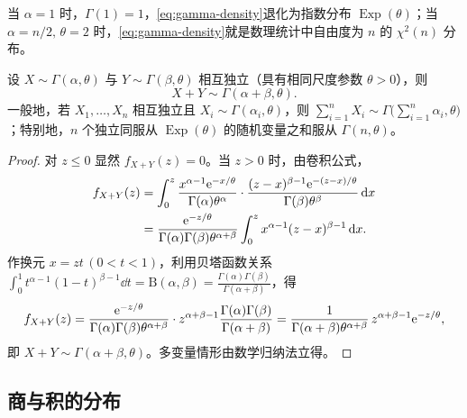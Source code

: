 当 $\alpha=1$ 时，$\Gamma(1)=1$，\eqref{eq:gamma-density}退化为指数分布 $\operatorname{Exp}(\theta)$；当 $\alpha=n/2,\,\theta=2$ 时，\eqref{eq:gamma-density}就是数理统计中自由度为 $n$ 的 $\chi^2(n)$ 分布。

\begin{proposition}
\label{prop:gamma-additivity}
设 $X\sim\Gamma(\alpha,\theta)$ 与 $Y\sim\Gamma(\beta,\theta)$ 相互独立（具有相同尺度参数 $\theta>0$），则
\[
  X+Y\sim\Gamma(\alpha+\beta,\theta).
\]
一般地，若 $X_1,\ldots,X_n$ 相互独立且 $X_i\sim\Gamma(\alpha_i,\theta)$，则 $\sum_{i=1}^{n}X_i\sim\Gamma\bigl(\sum_{i=1}^{n}\alpha_i,\theta\bigr)$；特别地，$n$ 个独立同服从 $\operatorname{Exp}(\theta)$ 的随机变量之和服从 $\Gamma(n,\theta)$。
\end{proposition}
\begin{proof}
对 $z\le 0$ 显然 $f_{X+Y}(z)=0$。当 $z>0$ 时，由卷积公式，
\[
\begin{aligned}
  f_{X+Y}(z)&=\int_{0}^{z}\frac{x^{\alpha-1}\mathrm{e}^{-x/\theta}}{\Gamma(\alpha)\theta^\alpha}\cdot
  \frac{(z-x)^{\beta-1}\mathrm{e}^{-(z-x)/\theta}}{\Gamma(\beta)\theta^\beta}\mathop{}\!\mathrm{d} x\\
  &=\frac{\mathrm{e}^{-z/\theta}}{\Gamma(\alpha)\Gamma(\beta)\theta^{\alpha+\beta}}
  \int_{0}^{z}x^{\alpha-1}(z-x)^{\beta-1}\mathop{}\!\mathrm{d} x.
\end{aligned}
\]
作换元 $x=zt\,(0<t<1)$，利用贝塔函数关系 $\int_{0}^{1}t^{\alpha-1}(1-t)^{\beta-1}\dd t=\mathrm{B}(\alpha,\beta)=\frac{\Gamma(\alpha)\Gamma(\beta)}{\Gamma(\alpha+\beta)}$，得
\[
  f_{X+Y}(z)=\frac{\mathrm{e}^{-z/\theta}}{\Gamma(\alpha)\Gamma(\beta)\theta^{\alpha+\beta}}\cdot
  z^{\alpha+\beta-1}\frac{\Gamma(\alpha)\Gamma(\beta)}{\Gamma(\alpha+\beta)}
  =\frac{1}{\Gamma(\alpha+\beta)\theta^{\alpha+\beta}}\,z^{\alpha+\beta-1}\mathrm{e}^{-z/\theta},
\]
即 $X+Y\sim\Gamma(\alpha+\beta,\theta)$。多变量情形由数学归纳法立得。
\end{proof}

\subsection{商与积的分布}

